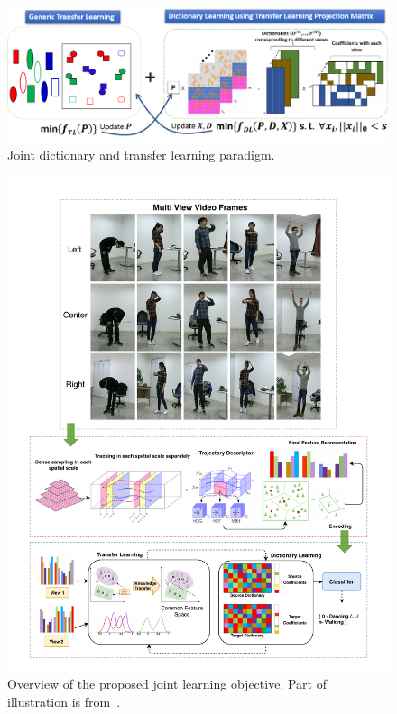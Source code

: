 \begin{figure}[!ht]
	\centering
	\includegraphics[width=.66\textheight]{figures/JLPara2}
	\linebreak
	\caption{Joint dictionary and transfer learning paradigm.}
	\label{fig1:JLP}
\end{figure}
\begin{figure}[!ht]
	\centering
	\includegraphics[width=.66\textheight]{figures/framework/updatewholepage2}
	\linebreak
	\caption{Overview of the proposed joint learning objective. Part of illustration is from~\cite{HengWang:2011:ARD:2191740.2192078}.}
	\label{fig1:JDTL}
\end{figure}
